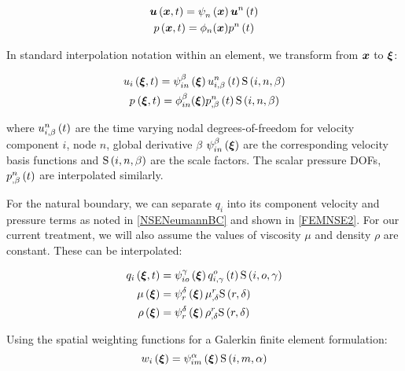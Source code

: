 \begin{gather}
  \fnof{\vect{u}}{\vect{x},t}=\gbfn{n}{}{\vect{x}}\fnof{\nodept{\vect{u}}{n}}{t}\\
  \fnof{p}{\vect{x},t}=\phi_{n}({\vect{x}})\fnof{\nodept{p}{n}}{t}
\end{gather}

In standard interpolation notation within an element, we transform from $\vect{x}$ to $\vect{\xi}$:

\begin{gather}
  \fnof{u_{i}}{\vect{\xi},t}=\idxgbfn{i}{n}{\beta}{\vect{\xi}}
  \fnof{\idxnodedof{u}{i}{n}{\beta}}{t}\idxgsf{i}{n}{\beta}\\
  \fnof{p_{}}{\vect{\xi},t}=\phi_{in}^{\beta}({\vect{\xi}})
  \fnof{\idxnodedof{p}{}{n}{\beta}}{t}\idxgsf{i}{n}{\beta}
\end{gather}

where $\fnof{\idxnodedof{u}{i}{n}{\beta}}{t}$ are the time varying nodal
degrees-of-freedom for velocity component $i$, node $n$, global
derivative $\beta$
$\idxgbfn{i}{n}{\beta}{\vect{\xi}}$ are the corresponding velocity basis functions 
and $\idxgsf{i}{n}{\beta}$ are the scale factors. The scalar pressure
DOFs, $\fnof{\idxnodedof{p}{}{n}{\beta}}{t}$ are interpolated
similarly.

For the natural boundary, we can separate $q_i$ into its
component velocity and pressure terms as noted in
\eqref{NSENeumannBC} and shown in \eqref{FEMNSE2}. For our current treatment, we will also assume the values of viscosity $\mu$ and density $\rho$ are constant. These can be interpolated:

\begin{equation}
  \begin{split}
    \fnof{q_{i}}{\vect{\xi},t} &= \idxgbfn{i}{o}{\gamma}{\vect{\xi}}
      \fnof{\idxnodedof{q}{i}{o}{\gamma}}{t}\idxgsf{i}{o}{\gamma} \\
    \fnof{\mu}{\vect{\xi}} &=\gbfn{r}{\delta}{\vect{\xi}}
    \nodedof{\mu}{r}{\delta}\gsf{r}{\delta} \\
    \fnof{\rho}{\vect{\xi}} &=\gbfn{r}{\delta}{\vect{\xi}}\nodedof{\rho}{r}{\delta}
    \gsf{r}{\delta} \\
  \end{split}
\end{equation}

 Using the spatial weighting functions for a Galerkin finite element formulation:
\begin{equation}
  \fnof{w_{i}}{\vect{\xi}}=\idxgbfn{i}{m}{\alpha}{\vect{\xi}}\idxgsf{i}{m}{\alpha}
\end{equation}


